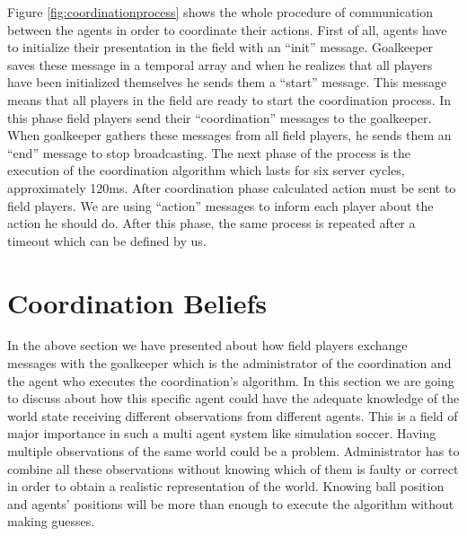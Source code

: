 Figure \ref{fig:coordinationprocess} shows the whole procedure of communication between the agents in order to coordinate their actions. First of all, agents have to initialize their presentation in the field with an ``init'' message. Goalkeeper saves these message in a temporal array and when he realizes that all players have been initialized themselves he sends them a ``start'' message. This message means that all players in the field are ready to start the coordination process. In this phase field players send their ``coordination'' messages to the goalkeeper. When goalkeeper gathers these messages from all field players, he sends them an ``end'' message to stop broadcasting. The next phase of the process is the execution of the coordination algorithm which lasts for six server cycles, approximately 120ms. After coordination phase calculated action must be sent to field players. We are using ``action'' messages to inform each player about the action he should do. After this phase, the same process is repeated after a timeout which can be defined by us.


\section{Coordination Beliefs}
In the above section we have presented about how field players exchange messages with the goalkeeper which is the administrator of the coordination and the agent who executes the coordination's algorithm. In this section we are going to discuss about how this specific agent could have the adequate knowledge of the world state receiving different observations from different agents. This is a field of major importance in such a multi agent system like simulation soccer. Having multiple observations of the same world could be a problem. Administrator has to combine all these observations without knowing which of them is faulty or correct in order to obtain a realistic representation of the world. Knowing ball position and agents' positions will be more than enough to execute the algorithm without making guesses.

